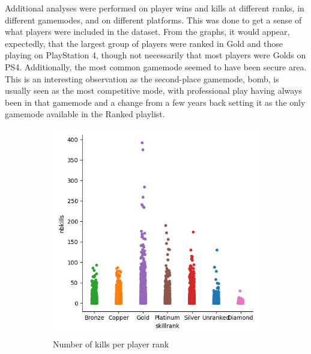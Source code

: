 \documentclass[12pt]{article}
\begin{document}
Additional analyses were performed on player wins and kills at different ranks, in different gamemodes, and on different platforms.
This was done to get a sense of what players were included in the dataset.
From the graphs, it would appear, expectedly, that the largest group of players were ranked in Gold and those playing on PlayStation 4, though not necessarily that most players were Golds on PS4.
Additionally, the most common gamemode seemed to have been secure area.
This is an interesting observation as the second-place gamemode, bomb, is usually seen as the most competitive mode, with professional play having always been in that gamemode and a change from a few years back setting it as the only gamemode available in the Ranked playlist.
\begin{figure}[H]
	\begin{subfigure}[h]{0.49\linewidth}
		\includegraphics[width=\textwidth]{kills-rank}
		\caption{Number of kills per player rank}
	\end{subfigure}
	\hfill
	\begin{subfigure}[h]{0.49\linewidth}

\end{subfigure}
\end{figure}
\end{document}
